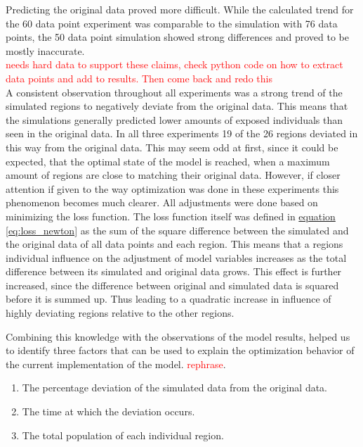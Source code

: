 Predicting the original data proved more difficult. While the calculated trend for the 60 data point experiment was comparable
to the simulation with 76 data points, the 50 data point simulation showed strong differences and proved to be mostly inaccurate.\\
\textcolor{red}{needs hard data to support these claims, check python code on how to extract data points and add to results.
Then come back and redo this}\\ %

A consistent observation throughout all experiments was a strong trend of the simulated regions to negatively deviate from the
original data. This means that the simulations generally predicted lower amounts of exposed individuals than seen in the original
data. In all three experiments 19 of the 26 regions deviated in this way from the original data. This may seem odd at first,
since it could be expected, that the optimal state of the model is reached, when a maximum amount of regions are close to matching
their original data. However, if  closer attention if given to the way optimization was done in these experiments this phenomenon
becomes much clearer. All adjustments were done based on minimizing the loss function. The loss function itself was defined in
\hyperref[eq:loss_newton]{equation \ref*{eq:loss_newton}} as the sum of the square difference between the simulated and the original
data of all data points and each region. This means that a regions individual influence on the adjustment of model variables
increases as the total difference between its simulated and original data grows. This effect is further increased, since the
difference between original and simulated data is squared before it is summed up. Thus leading to a quadratic increase in influence
of highly deviating regions relative to the other regions. \newline

Combining this knowledge with the observations of the model results, helped us to identify three factors that can be used to explain
the optimization behavior of the current implementation of the model. \textcolor{red}{rephrase}.

\begin{enumerate}[label=\arabic*.]
	\item The percentage deviation of the simulated data from the original data.
	\item The time at which the deviation occurs.
	\item The total population of each individual region.
\end{enumerate}

